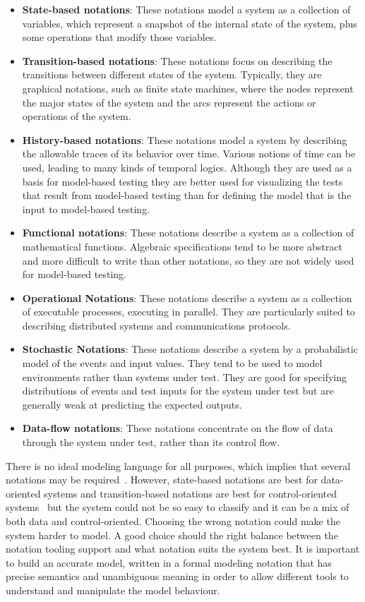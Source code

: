 \begin{itemize}
\item \textbf{State-based notations}: These notations model a system as a collection of
variables, which represent a snapshot of the internal state of the system, plus
some operations that modify those variables.
\item \textbf{Transition-based notations}: These notations focus on describing the
transitions between different states of the system. Typically, they are
graphical notations, such as finite state machines, where the nodes represent
the major states of the system and the arcs represent the actions or operations
of the system.
\item \textbf{History-based notations}:  These notations model a system by
describing the allowable traces of its behavior over time. Various notions of
time can be used, leading to many kinds of temporal logics. Although they are
used as a basis for model-based testing they are better used for visualizing the
tests that result from model-based testing than for defining the model that is
the input to model-based testing.
\item \textbf{Functional notations}: These notations describe a system as a
collection of mathematical functions. Algebraic specifications tend to be more
abstract and more difficult to write than other notations, so they are not
widely used for model-based testing.
\item \textbf{Operational Notations}: These notations describe a system as a
collection of executable processes, executing in parallel. They are particularly
suited to describing distributed systems and communications protocols.
\item \textbf{Stochastic Notations}: These notations describe a system by a
probabilistic model of the events and input values. They tend to be used to model
environments rather than systems under test. They are good for specifying
distributions of events and test inputs for the system under test but are
generally weak at predicting the expected outputs.
\item \textbf{Data-flow notations}: These notations concentrate on the flow of
data through the system under test, rather than its control flow.
\end{itemize}

There is no ideal modeling language for all purposes, which implies that several
notations may be required~\cite{Dalal1999}. However, state-based notations are
best for data-oriented systems and transition-based
notations are best for control-oriented systems~\cite{1200168} but the system
could not be so easy to classify and it can be a mix of both data and
control-oriented. Choosing the wrong notation could make the system harder to
model. A good choice should the right balance between the notation tooling
support and what notation suits the system best. It is important to build
an accurate model, written in a formal modeling notation that has precise
semantics and unambiguous meaning in order to allow different tools to
understand and manipulate the model behaviour.

